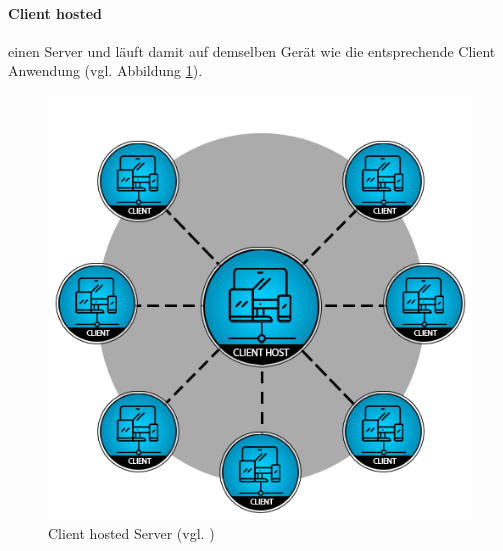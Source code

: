 \paragraph{Client hosted} einen Server und läuft damit auf demselben Gerät wie die entsprechende Client Anwendung (vgl. Abbildung \ref{fig:client_server}).

\begin{figure}[ht]
\centering
\includegraphics[width=1\linewidth]{content/pictures/client-hosted-16be0b1c9b5020f21325b1e6a7beca73.png}
\caption{Client hosted Server (vgl. \cite{noauthor_network_2024})}
\label{fig:client_server}
\end{figure}



